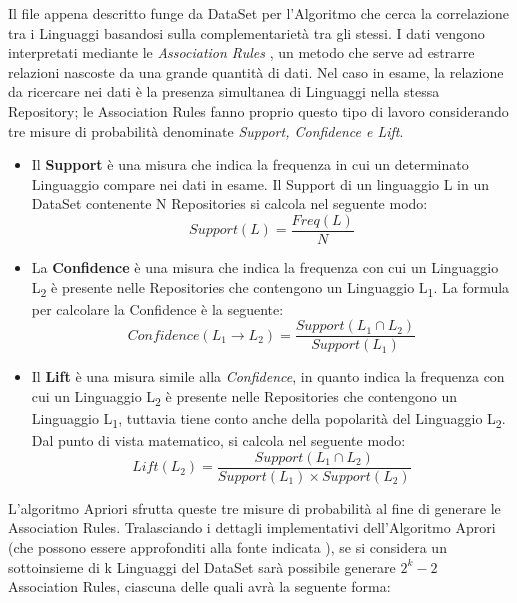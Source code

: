 Il file appena descritto funge da DataSet per l'Algoritmo che cerca la correlazione tra i Linguaggi basandosi sulla complementarietà tra gli stessi. 
I dati vengono interpretati mediante le \emph{Association Rules} \cite{AssociationRules}, un metodo che serve ad estrarre relazioni nascoste da una grande quantità di dati. Nel caso in esame, la relazione da ricercare nei dati è la presenza simultanea di Linguaggi nella stessa Repository; le Association Rules fanno proprio questo tipo di lavoro considerando tre misure di probabilità denominate \emph{Support, Confidence e Lift}.
\begin{itemize}
    \item Il \textbf{Support} è una misura che indica la frequenza in cui un determinato Linguaggio compare nei dati in esame. Il Support di un linguaggio L in un DataSet contenente N Repositories si calcola nel seguente modo: 
        \begin{equation}    
            Support(L)=\frac{Freq(L)}{N}
        \end{equation}    
    \item La \textbf{Confidence} è una misura che indica la frequenza con cui un Linguaggio L\textsubscript2 è presente nelle Repositories che contengono un Linguaggio L\textsubscript1. La formula per calcolare la Confidence è la seguente:
        \begin{equation}
            Confidence(L_1 \rightarrow L_2)=\frac{Support(L_1 \cap L_2)}{Support(L_1)}
        \end{equation}
    \item Il \textbf{Lift} è una misura simile alla \emph{Confidence}, in quanto indica la frequenza con cui un Linguaggio L\textsubscript2 è presente nelle Repositories che contengono un Linguaggio L\textsubscript1, tuttavia tiene conto anche della popolarità del Linguaggio L\textsubscript2. Dal punto di vista matematico, si calcola nel seguente modo:
        \begin{equation}
            Lift(L_2)=\frac{Support(L_1 \cap L_2)}{Support(L_1) \times Support(L_2)}
        \end{equation}
\end{itemize}
L'algoritmo Apriori sfrutta queste tre misure di probabilità al fine di generare le Association Rules. Tralasciando i dettagli implementativi dell'Algoritmo Aprori (che possono essere approfonditi alla fonte indicata \cite{AssociationRules}), se si considera un sottoinsieme di k Linguaggi del DataSet sarà possibile generare $2^k-2$ Association Rules, ciascuna delle quali avrà la seguente forma:
